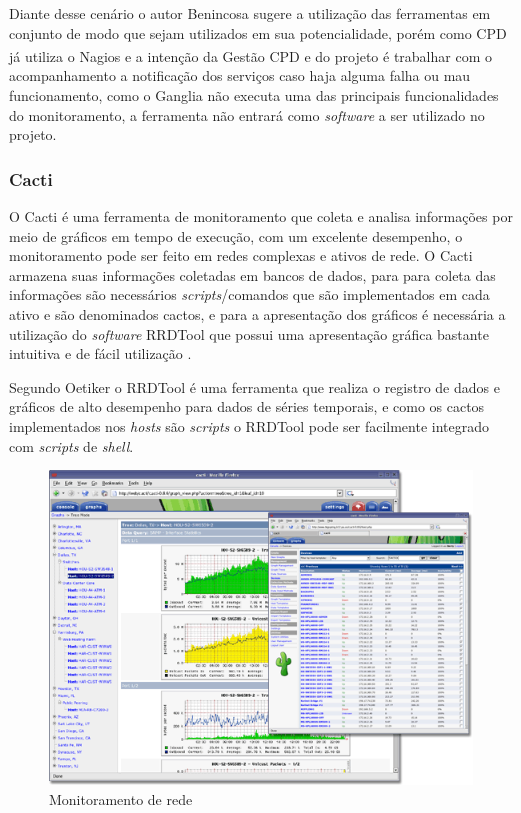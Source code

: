  Diante desse cenário o autor Benincosa \cite{benincosa2ganglia} sugere a utilização das ferramentas em conjunto de modo que sejam utilizados em sua potencialidade, porém como \acrshort{CPD} já utiliza o Nagios\textsuperscript{\textregistered} e a intenção da Gestão \acrshort{CPD} e do projeto é trabalhar com o acompanhamento a notificação dos serviços caso haja alguma falha ou mau funcionamento, como o Ganglia não executa uma das principais funcionalidades do monitoramento, a ferramenta não entrará como \textit{software} a ser utilizado no projeto.
 

\subsubsection{Cacti}

O Cacti é uma ferramenta de monitoramento que coleta e analisa informações por meio de gráficos em tempo de execução, com um excelente desempenho, o monitoramento pode ser feito em redes complexas e ativos de rede. O Cacti armazena suas informações coletadas em bancos de dados, para para coleta das informações são necessários \textit{scripts}/comandos que são implementados em cada ativo e são denominados cactos, e para a apresentação dos gráficos é necessária a utilização do \textit{software}  \acrfull{RRDTool} que possui uma apresentação gráfica bastante intuitiva e de fácil utilização \cite{cacti}.

Segundo Oetiker\cite{rrdtool} o \acrshort{RRDTool} é uma ferramenta que realiza o registro de dados e gráficos de alto desempenho para dados de séries temporais, e como os cactos implementados nos \textit{hosts} são \textit{scripts} o \acrshort{RRDTool} pode ser facilmente integrado com  \textit{scripts} de \textit{shell}. 

\begin{figure}[H]
	\begin{center}
	\includegraphics[scale = 0.50]{img/cacti_promo_main.png}
		\caption{Monitoramento de rede \cite{cacti}}
		\label{fun:fig:cacti}
	\end{center}
\end{figure}

